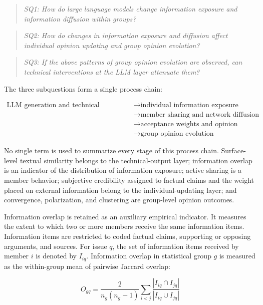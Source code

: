 \documentclass[11pt,a4paper]{article}
\begin{document}
\begin{quote}\itshape
SQ1: How do large language models change information exposure and information diffusion within groups?
\end{quote}

\begin{quote}\itshape
SQ2: How do changes in information exposure and diffusion affect individual opinion updating and group opinion evolution?
\end{quote}

\begin{quote}\itshape
SQ3: If the above patterns of group opinion evolution are observed, can technical interventions at the LLM layer attenuate them?
\end{quote}

The three subquestions form a single process chain:

\begin{equation*}
\begin{aligned}\text{LLM generation and technical configuration} &\rightarrow \text{individual information exposure} \\
&\rightarrow \text{member sharing and network diffusion} \\
&\rightarrow \text{acceptance weights and opinion updating} \\
&\rightarrow \text{group opinion evolution}\end{aligned}
\end{equation*}

No single term is used to summarize every stage of this process chain. Surface-level textual similarity belongs to the technical-output layer; information overlap is an indicator of the distribution of information exposure; active sharing is a member behavior; subjective credibility assigned to factual claims and the weight placed on external information belong to the individual-updating layer; and convergence, polarization, and clustering are group-level opinion outcomes.

Information overlap is retained as an auxiliary empirical indicator. It measures the extent to which two or more members receive the same information items. Information items are restricted to coded factual claims, supporting or opposing arguments, and sources. For issue $q$, the set of information items received by member $i$ is denoted by $I_{iq}$. Information overlap in statistical group $g$ is measured as the within-group mean of pairwise Jaccard overlap:

\begin{equation*}
O_{gq}
=
\frac{2}{n_g(n_g-1)}
\sum_{i<j}
\frac{|I_{iq}\cap I_{jq}|}{|I_{iq}\cup I_{jq}|}
\end{equation*}
\end{document}
